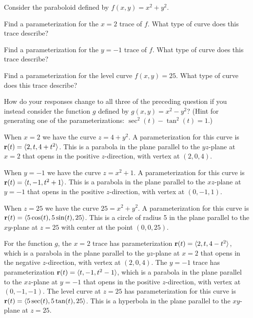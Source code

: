 \begin{activity} \label{A:9.6.4} Consider the paraboloid defined by $f(x,y) = x^2+y^2$.
    \ba
    \item Find a parameterization for the $x=2$ trace of $f$. What type of curve does this trace describe? 

    \item Find a parameterization for the $y=-1$ trace of $f$. What type of curve does this trace describe?

    \item Find a parameterization for the level curve $f(x,y) = 25$. What type of curve does this trace describe?

    \item How do your responses change to all three of the preceding question if you instead consider the function $g$ defined by $g(x,y) = x^2 - y^2$? (Hint for generating one of the parameterizations: $\sec^2(t)-\tan^2(t) = 1$.)

    \ea

\end{activity}
\begin{smallhint}

\end{smallhint}
\begin{bighint}

\end{bighint}
\begin{activitySolution}
    \ba
    \item When $x=2$ we have the curve $z = 4+y^2$. A parameterization for this curve is $\mathbf{r}(t) = \langle 2, t, 4+t^2 \rangle$. This is a parabola in the plane parallel to the $yz$-plane at $x=2$ that opens in the positive $z$-direction, with vertex at $(2,0,4)$. 
    \item When $y=-1$ we have the curve $z = x^2+1$. A parameterization for this curve is $\mathbf{r}(t) = \langle t, -1, t^2+1 \rangle$. This is a parabola in the plane parallel to the $xz$-plane at $y=-1$ that opens in the positive $z$-direction, with vertex at $(0,-1,1)$. 
    \item When $z=25$ we have the curve $25 = x^2+y^2$. A parameterization for this curve is $\mathbf{r}(t) = \langle 5\cos(t), 5\sin(t), 25 \rangle$. This is a circle of radius 5 in the plane parallel to the $xy$-plane at $z=25$ with center at the point $(0,0,25)$. 
    \item For the function $g$, the $x=2$ trace has parameterization $\mathbf{r}(t) = \langle 2, t, 4-t^2 \rangle$, which is a parabola in the plane parallel to the $yz$-plane at $x=2$ that opens in the negative $z$-direction, with vertex at $(2,0,4)$.  The $y=-1$ trace has parameterization $\mathbf{r}(t) = \langle t, -1, t^2-1 \rangle$, which is a parabola in the plane parallel to the $xz$-plane at $y=-1$ that opens in the positive $z$-direction, with vertex at $(0,-1,-1)$. The level curve at $z=25$ has parameterization for this curve is $\mathbf{r}(t) = \langle 5\sec(t), 5\tan(t), 25 \rangle$. This is a hyperbola in the plane parallel to the $xy$-plane at $z=25$.  
    \ea
\end{activitySolution}
\aftera
